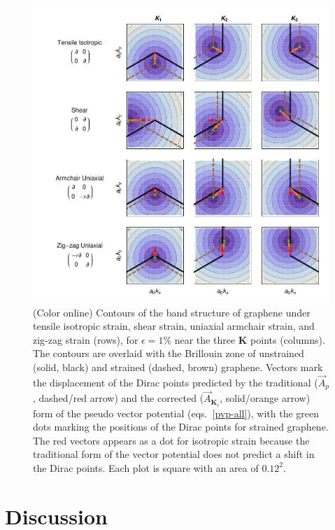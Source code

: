 \begin{figure}
\includegraphics{Figs_PVP/figure_2.pdf}
\caption{(Color online) Contours of the band structure of graphene under tensile isotropic strain, shear strain, uniaxial armchair strain, and zig-zag strain (rows), for $\epsilon=1\%$ near the three $\bm{K}$ points (columns). The contours are overlaid with the Brillouin zone of unstrained (solid, black)  and strained (dashed, brown) graphene. Vectors mark the displacement of the Dirac points predicted by the traditional ($\vec{A}_p$, dashed/red arrow) and the corrected ($\vec{A}_{\bm{K}_{\!i}}$, solid/orange arrow) form of the pseudo vector potential (eqs.~\ref{pvp-all}), with the green dots marking the positions of the Dirac points for strained graphene. The red vectors appears as a dot for isotropic strain because the traditional form of the vector potential does not predict a shift in the Dirac points.  Each plot is square with an area of $0.12^2$. \label{PVPshifts}}
\end{figure}


\section{Discussion}

